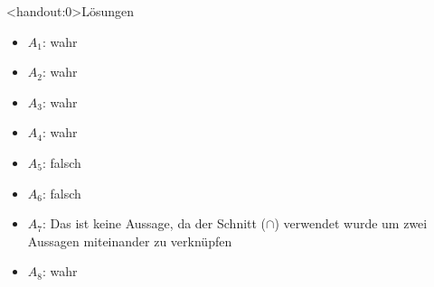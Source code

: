 {
\begin{frame}<handout:0>{Lösungen}
	\begin{itemize}[<+- | alert@+>]
		\item
		      $A_1$: wahr
		\item
		      $A_2$: wahr
		\item
		      $A_3$: wahr
		\item
		      $A_4$: wahr
		\item
		      $A_5$: falsch
		\item
		      $A_6$: falsch
		\item
		      $A_7$: Das ist keine Aussage, da der Schnitt ($\cap$) verwendet wurde um zwei Aussagen miteinander zu verknüpfen
		\item
		      $A_8$: wahr
	\end{itemize}
\end{frame}
}


